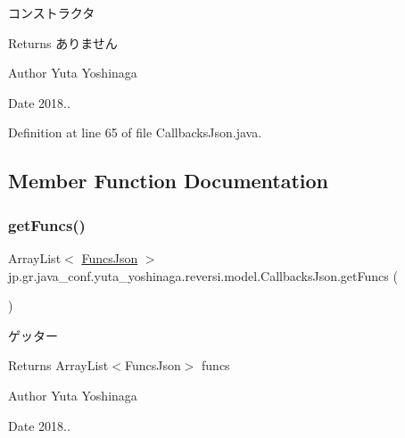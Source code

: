 コンストラクタ 

\begin{DoxyReturn}{Returns}
ありません 
\end{DoxyReturn}
\begin{DoxyAuthor}{Author}
Yuta Yoshinaga 
\end{DoxyAuthor}
\begin{DoxyDate}{Date}
2018.. 
\end{DoxyDate}


Definition at line 65 of file Callbacks\+Json.\+java.



\subsection{Member Function Documentation}
\mbox{\label{classjp_1_1gr_1_1java__conf_1_1yuta__yoshinaga_1_1reversi_1_1model_1_1_callbacks_json_af9a62a3dbe6416793c01d7a0f69da2b1}} 
\subsubsection{\texorpdfstring{get\+Funcs()}{getFuncs()}}
{\footnotesize\ttfamily Array\+List$<$ \hyperlink{classjp_1_1gr_1_1java__conf_1_1yuta__yoshinaga_1_1reversi_1_1model_1_1_funcs_json}{Funcs\+Json} $>$ jp.\+gr.\+java\+\_\+conf.\+yuta\+\_\+yoshinaga.\+reversi.\+model.\+Callbacks\+Json.\+get\+Funcs (\begin{DoxyParamCaption}{ }\end{DoxyParamCaption})}



ゲッター 

\begin{DoxyReturn}{Returns}
Array\+List$<$\+Funcs\+Json$>$ funcs 
\end{DoxyReturn}
\begin{DoxyAuthor}{Author}
Yuta Yoshinaga 
\end{DoxyAuthor}
\begin{DoxyDate}{Date}
2018.. 
\end{DoxyDate}


